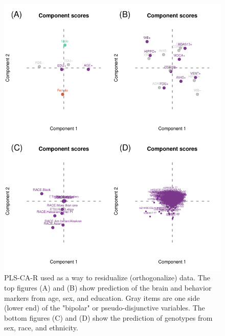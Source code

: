 \documentclass[12pt]{article}
\begin{document}
\begin{figure}[!hbtp]

{\centering \includegraphics[width=.8\textwidth,height=.8\textheight]{PLSCAR_to_a_GPLS_files/figure-latex/unnamed-chunk-9-1} 

}

\caption{\label{fig:confound_predictors_ex2} PLS-CA-R used as a way to residualize (orthogonalize) data. The top figures (A) and (B) show prediction of the brain and behavior markers from age, sex, and education. Gray items are one side (lower end) of the "bipolar" or pseudo-disjunctive variables. The bottom figures (C) and (D) show the prediction of genotypes from sex, race, and ethnicity.}\label{fig:unnamed-chunk-9}
\end{figure}
\end{document}
